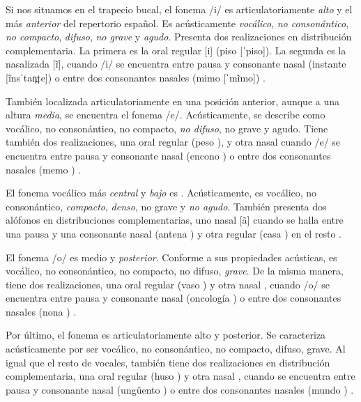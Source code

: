Si nos situamos en el trapecio bucal, el fonema /i/ es articulatoriamente \textit{alto} y el más \textit{anterior} del repertorio español. Es acústicamente \textit{vocálico}, \textit{no consonántico}, \textit{no compacto}, \textit{difuso}, \textit{no grave} y \textit{agudo}. Presenta dos realizaciones en distribución complementaria. La primera es la oral regular [i] (\textlangle{}piso\textrangle{} [ˈpiso]). La segunda es la nasalizada [ĩ], cuando /i/ se encuentra entre pausa y consonante nasal (\textlangle{}instante\textrangle{} [ĩnsˈtan̪te]) o entre dos consonantes nasales (\textlangle{}mimo\textrangle{} [ˈmĩmo]) \parencite[168-169]{quilis2019}.

También localizada articulatoriamente en una posición anterior, aunque a una altura \textit{media}, se encuentra el fonema /e/. Acústicamente, se describe como vocálico, no consonántico, no compacto, \textit{no difuso}, no grave y agudo. Tiene también dos realizaciones, una oral regular \ipa{[e]} (\textlangle{}peso\textrangle{} \ipa{[ˈpeso]}), y otra  nasal \ipa{[ẽ]} cuando /e/ se encuentra entre pausa y consonante nasal (\textlangle{}encono\textrangle{} \ipa{[ẽŋˈkono]}) o entre dos consonantes nasales (\textlangle{}memo\textrangle{} \ipa{[ˈmẽmo]}) \parencite[169]{quilis2019}.

El fonema vocálico más \textit{central} y \textit{bajo} es . Acústicamente, es vocálico, no consonántico, \textit{compacto}, \textit{denso}, no grave y \textit{no agudo}. También  presenta dos alófonos en distribuciones complementarias, uno nasal [ã] cuando se halla entre una pausa y una consonante nasal (\textlangle{}antena\textrangle{} \ipa{[ãn̪ˈtena]}) y otra regular \ipa{[a]} (\textlangle{}casa\textrangle{} \ipa{[ˈkasa]}) en el resto  \parencite[169]{quilis2019}.

El fonema /o/ es medio y \textit{posterior}. Conforme a sus propiedades acústicas, es vocálico, no consonántico, no compacto, no difuso, \textit{grave}. De la misma manera,  tiene dos realizaciones, una oral regular \ipa{[o]} (\textlangle{}vaso\textrangle{} \ipa{[ˈBaso]}) y otra  nasal \ipa{[õ]}, cuando /o/ se encuentra entre pausa y consonante nasal (\textlangle{}oncología\textrangle{}  \ipa{[õŋkoloˈxia]}) o entre dos consonantes nasales (\textlangle{}nona\textrangle{} \ipa{['nõna]}) \parencite[169]{quilis2019}.

Por último, el fonema  es articulatoriamente alto y posterior. Se caracteriza acústicamente por ser vocálico, no consonántico, no compacto, difuso, grave. Al igual que el resto de vocales,  también tiene dos realizaciones en distribución complementaria, una oral regular \ipa{[u]} (\textlangle{}huso\textrangle{} \ipa{['uso]}) y otra  nasal \ipa{[ũ]}, cuando  se encuentra entre pausa y consonante nasal (\textlangle{}ungüento\textrangle{} \ipa{[ũŋˈgwen̪to]}) o entre dos consonantes nasales (\textlangle{}mundo\textrangle{} \ipa{[ˈmũn̪do]}) \parencite[170]{quilis2019}.

